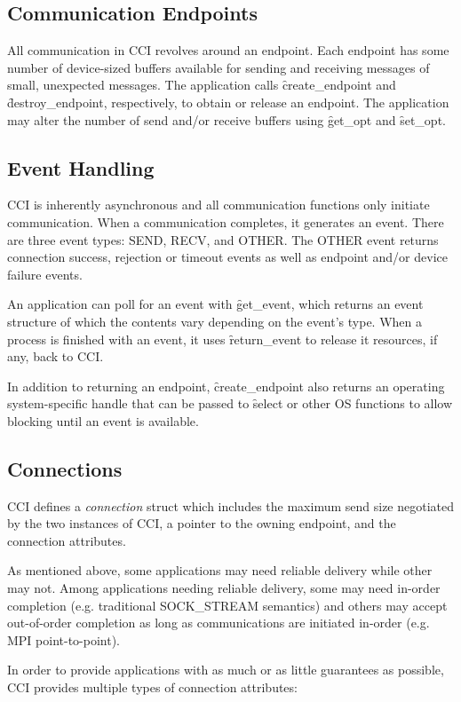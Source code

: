 \documentclass[conference]{IEEEtran}
\begin{document}
\subsection{Communication Endpoints}
All communication in CCI revolves around an endpoint. Each endpoint has some number of
device-sized buffers available for sending and receiving messages of small, unexpected
messages. The application calls \f{create\_endpoint} and \f{destroy\_endpoint},
respectively, to obtain or release an endpoint. The application may alter the number of
send and/or receive buffers using \f{get\_opt} and \f{set\_opt}.

\subsection{Event Handling}
CCI is inherently asynchronous and all communication functions only initiate
communication. When a communication completes, it generates an event. There are three
event types: SEND, RECV, and OTHER. The OTHER event returns connection success, rejection
or timeout events as well as endpoint and/or device failure events.

An application can poll for an event with \f{get\_event}, which returns an event structure
of which the contents vary depending on the event's type. When a process is finished with
an event, it uses \f{return\_event} to release it resources, if any, back to CCI.

In addition to returning an endpoint, \f{create\_endpoint} also returns an operating
system-specific handle that can be passed to \f{select} or other OS functions to allow
blocking until an event is available.

\subsection{Connections}
CCI defines a \emph{connection} struct which includes the maximum send size negotiated by
the two instances of CCI, a pointer to the owning endpoint, and the connection attributes.

As mentioned above, some applications may need reliable delivery while other may not.
Among applications needing reliable delivery, some may need in-order completion (e.g.
traditional SOCK\_STREAM semantics) and others may accept out-of-order completion as long
as communications are initiated in-order (e.g. MPI point-to-point).

In order to provide applications with as much or as little guarantees as possible, CCI
provides multiple types of connection attributes:
\end{document}
